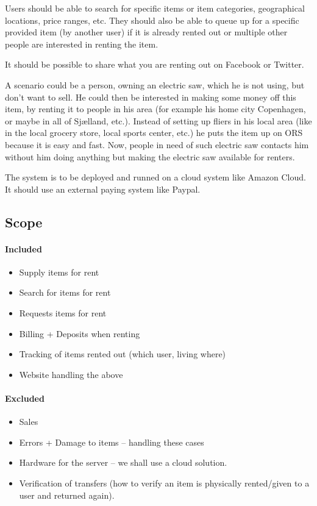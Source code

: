 \documentclass[a4paper,11pt]{report}
\begin{document}
Users should be able to search for specific items or item categories,
geographical locations, price ranges, etc. They should also be able to queue up
for a specific provided item (by another user) if it is already rented out or
multiple other people are interested in renting the item.

It should be possible to share what you are renting out on Facebook or Twitter.

A scenario could be a person, owning an electric saw, which he is not using, but
don't want to sell. He could then be interested in making some money off this
item, by renting it to people in his area (for example his home city Copenhagen,
or maybe in all of Sjælland, etc.). Instead of setting up fliers in his local
area (like in the local grocery store, local sports center, etc.) he puts the
item up on ORS because it is easy and fast. Now, people in need of such electric
saw contacts him without him doing anything but making the electric saw
available for renters.

The system is to be deployed and runned on a cloud system like Amazon Cloud. It should use an external paying system like Paypal.

\subsection{Scope}
\paragraph{Included}
\begin{itemize}
\item Supply items for rent
\item Search for items for rent
\item Requests items for rent
\item Billing + Deposits when renting
\item Tracking of items rented out (which user, living where)
\item Website handling the above
\end{itemize}

\paragraph{Excluded}
\begin{itemize}
\item Sales
\item Errors + Damage to items -- handling these cases
\item Hardware for the server -- we shall use a cloud solution.
\item Verification of transfers (how to verify an item is physically rented/given to a user and returned again).
\end{itemize}
\end{document}

